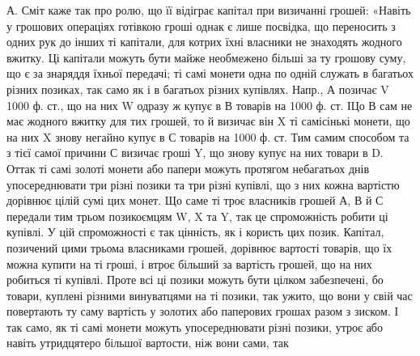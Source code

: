 А. Сміт каже так про ролю, що її відіграє капітал при визичанні грошей:
«Навіть у грошових операціях готівкою гроші однак є лише посвідка, що переносить
з одних рук до інших ті капітали, для котрих їхні власники не знаходять
жодного вжитку. Ці капітали можуть бути майже необмежено більші за ту
грошову суму, що є за знаряддя їхньої передачі; ті самі монети одна по одній
служать в багатьох різних позиках, так само як і в багатьох різних купівлях.
Напр., А позичає V 1000 ф. ст., що на них W одразу ж купує в В товарів
на 1000 ф. ст. ІЦо В сам не має жодного вжитку для тих грошей, то й визичає
він X ті самісінькі монети, що на них X знову негайно купує в С товарів
на 1000 ф. ст. Тим самим способом та з тієї самої причини С визичає гроші
Y, що знову купує на них товари в D. Оттак ті самі золоті монети або папери
можуть протягом небагатьох днів упосереднювати три різні позики та три різні
купівлі, що з них кожна вартістю дорівнює цілій сумі цих монет. Що саме ті троє
власників грошей А, В й С передали тим трьом позикоємцям W, X та Y, так це
спроможність робити ці купівлі. У цій спроможності є так цінність, як і користь цих
позик. Капітал, позичений цими трьома власниками грошей, дорівнює вартості
товарів, що їх можна купити на ті гроші, і втроє більший за вартість грошей,
що на них робиться ті купівлі. Проте всі ці позики можуть бути цілком забезпечені,
бо товари, куплені різними винуватцями на ті позики, так ужито, що
вони у свій час повертають ту саму вартість у золотих або паперових грошах
разом з зиском. І так само, як ті самі монети можуть упосереднювати різні позики,
утроє або навіть утридцятеро більшої вартости, ніж вони сами, так
\parbreak{}  %
